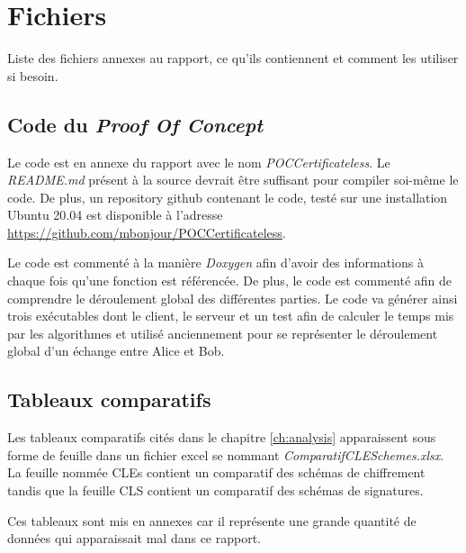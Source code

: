 \chapter{Fichiers}
\label{ch:fichiers}
Liste des fichiers annexes au rapport, ce qu'ils contiennent et comment les utiliser si besoin.
\section{Code du \textit{Proof Of Concept}}
Le code est en annexe du rapport avec le nom \textit{POCCertificateless}.
Le \textit{README.md} présent à la source devrait être suffisant pour compiler soi-même le code. De plus, un repository github contenant le code, testé sur une installation Ubuntu 20.04 est disponible à l'adresse \url{https://github.com/mbonjour/POCCertificateless}.

Le code est commenté à la manière \textit{Doxygen} afin d'avoir des informations à chaque fois qu'une fonction est référencée. De plus, le code est commenté afin de comprendre le déroulement global des différentes parties. Le code va générer ainsi trois exécutables dont le client, le serveur et un test afin de calculer le temps mis par les algorithmes et utilisé anciennement pour se représenter le déroulement global d'un échange entre Alice et Bob.
\section{Tableaux comparatifs}
Les tableaux comparatifs cités dans le chapitre \ref{ch:analysis} apparaissent sous forme de feuille dans un fichier excel se nommant \textit{ComparatifCLESchemes.xlsx}. 
La feuille nommée CLEs contient un comparatif des schémas de chiffrement tandis que la feuille CLS contient un comparatif des schémas de signatures.

Ces tableaux sont mis en annexes car il représente une grande quantité de données qui apparaissait mal dans ce rapport.